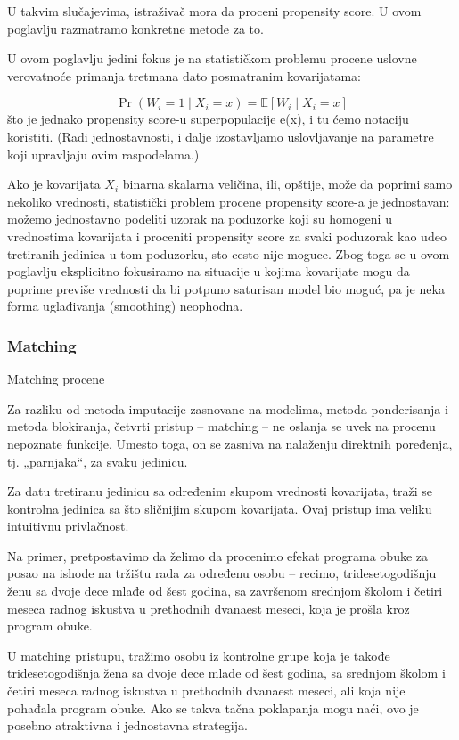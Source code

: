 \documentclass[12pt, a4paper]{article}
\begin{document}
U takvim slučajevima, istraživač mora da proceni propensity score. U ovom poglavlju razmatramo konkretne metode za to.

U ovom poglavlju jedini fokus je na statističkom problemu procene uslovne verovatnoće primanja tretmana dato posmatranim kovarijatama:

\[
\Pr(W_i = 1 \mid X_i = x) = \mathbb{E}[W_i \mid X_i = x]
\]
što je jednako propensity score-u superpopulacije e(x), i tu ćemo notaciju koristiti. (Radi jednostavnosti, i dalje izostavljamo uslovljavanje na parametre koji upravljaju ovim raspodelama.)

Ako je kovarijata \(X_i\) binarna skalarna veličina, ili, opštije, može da poprimi samo nekoliko vrednosti, statistički problem procene propensity score-a je jednostavan: možemo jednostavno podeliti uzorak na poduzorke koji su homogeni u vrednostima kovarijata i proceniti propensity score za svaki poduzorak kao udeo tretiranih jedinica u tom poduzorku, sto cesto  nije moguce. Zbog toga se u ovom poglavlju eksplicitno fokusiramo na situacije u kojima kovarijate mogu da poprime previše vrednosti da bi potpuno saturisan model bio moguć, pa je neka forma uglađivanja (smoothing) neophodna.


\subsubsection{Matching}
Matching procene

Za razliku od metoda imputacije zasnovane na modelima, metoda ponderisanja i metoda blokiranja, četvrti pristup – matching – ne oslanja se uvek na procenu nepoznate funkcije. Umesto toga, on se zasniva na nalaženju direktnih poređenja, tj. „parnjaka“, za svaku jedinicu.

Za datu tretiranu jedinicu sa određenim skupom vrednosti kovarijata, traži se kontrolna jedinica sa što sličnijim skupom kovarijata. Ovaj pristup ima veliku intuitivnu privlačnost.

Na primer, pretpostavimo da želimo da procenimo efekat programa obuke za posao na ishode na tržištu rada za određenu osobu – recimo, tridesetogodišnju ženu sa dvoje dece mlađe od šest godina, sa završenom srednjom školom i četiri meseca radnog iskustva u prethodnih dvanaest meseci, koja je prošla kroz program obuke.

U matching pristupu, tražimo osobu iz kontrolne grupe koja je takođe tridesetogodišnja žena sa dvoje dece mlađe od šest godina, sa srednjom školom i četiri meseca radnog iskustva u prethodnih dvanaest meseci, ali koja nije pohađala program obuke. Ako se takva tačna poklapanja mogu naći, ovo je posebno atraktivna i jednostavna strategija.
\end{document}
